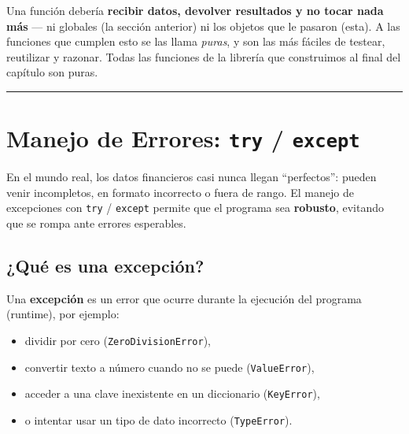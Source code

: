 \documentclass[
  spanish,
  letterpaper,
  DIV=11,
  numbers=noendperiod]{scrreprt}
\providecommand{\tightlist}{%
  \setlength{\itemsep}{0pt}\setlength{\parskip}{0pt}}
\begin{document}
\begin{tcolorbox}[enhanced jigsaw, bottomrule=.15mm, colback=white, opacitybacktitle=0.6, arc=.35mm, toprule=.15mm, opacityback=0, breakable, titlerule=0mm, left=2mm, coltitle=black, colbacktitle=quarto-callout-tip-color!10!white, colframe=quarto-callout-tip-color-frame, leftrule=.75mm, toptitle=1mm, bottomtitle=1mm, title=\textcolor{quarto-callout-tip-color}{\faLightbulb}\hspace{0.5em}{La convención del oficio}, rightrule=.15mm]

Una función debería \textbf{recibir datos, devolver resultados y no
tocar nada más} --- ni globales (la sección anterior) ni los objetos que
le pasaron (esta). A las funciones que cumplen esto se las llama
\emph{puras}, y son las más fáciles de testear, reutilizar y razonar.
Todas las funciones de la librería que construimos al final del capítulo
son puras.

\end{tcolorbox}

\begin{center}\rule{0.5\linewidth}{0.5pt}\end{center}

\section{\texorpdfstring{Manejo de Errores: \texttt{try} /
\texttt{except}}{Manejo de Errores: try / except}}\label{manejo-de-errores-try-except}

En el mundo real, los datos financieros casi nunca llegan ``perfectos'':
pueden venir incompletos, en formato incorrecto o fuera de rango. El
manejo de excepciones con \texttt{try} / \texttt{except} permite que el
programa sea \textbf{robusto}, evitando que se rompa ante errores
esperables.

\subsection{¿Qué es una excepción?}\label{quuxe9-es-una-excepciuxf3n}

Una \textbf{excepción} es un error que ocurre durante la ejecución del
programa (runtime), por ejemplo:

\begin{itemize}
\tightlist
\item
  dividir por cero (\texttt{ZeroDivisionError}),
\item
  convertir texto a número cuando no se puede (\texttt{ValueError}),
\item
  acceder a una clave inexistente en un diccionario (\texttt{KeyError}),
\item
  o intentar usar un tipo de dato incorrecto (\texttt{TypeError}).
\end{itemize}
\end{document}
